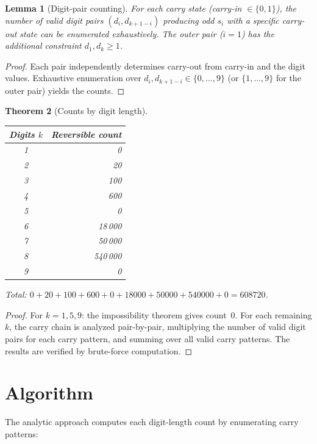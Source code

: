 \documentclass[12pt]{article}
\newtheorem{theorem}{Theorem}
\newtheorem{lemma}[theorem]{Lemma}
\begin{document}
\begin{lemma}[Digit-pair counting]
For each carry state (carry-in $\in \{0,1\}$), the number of valid digit pairs $(d_i, d_{k+1-i})$ producing odd $s_i$ with a specific carry-out state can be enumerated exhaustively. The outer pair ($i=1$) has the additional constraint $d_1, d_k \geq 1$.
\end{lemma}

\begin{proof}
Each pair independently determines carry-out from carry-in and the digit values. Exhaustive enumeration over $d_i, d_{k+1-i} \in \{0,\ldots,9\}$ (or $\{1,\ldots,9\}$ for the outer pair) yields the counts.
\end{proof}

\begin{theorem}[Counts by digit length]
\begin{center}
\begin{tabular}{@{}cr@{}}
\toprule
Digits $k$ & Reversible count \\
\midrule
1 & 0 \\
2 & 20 \\
3 & 100 \\
4 & 600 \\
5 & 0 \\
6 & 18\,000 \\
7 & 50\,000 \\
8 & 540\,000 \\
9 & 0 \\
\bottomrule
\end{tabular}
\end{center}
Total: $0 + 20 + 100 + 600 + 0 + 18000 + 50000 + 540000 + 0 = 608720$.
\end{theorem}

\begin{proof}
For $k = 1, 5, 9$: the impossibility theorem gives count~0. For each remaining $k$, the carry chain is analyzed pair-by-pair, multiplying the number of valid digit pairs for each carry pattern, and summing over all valid carry patterns. The results are verified by brute-force computation.
\end{proof}

\section{Algorithm}

The analytic approach computes each digit-length count by enumerating carry patterns:
\end{document}
